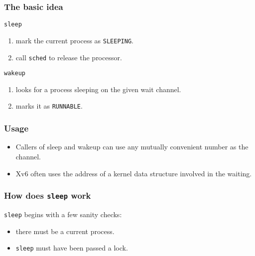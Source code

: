 \documentclass{beamer}
\begin{document}
\begin{frame}[t]
  \frametitle{The basic idea}
  \texttt{sleep}
  \begin{enumerate}
  \item mark the current process as \texttt{SLEEPING}.
  \item call \texttt{sched} to release the processor.
  \end{enumerate}

  \texttt{wakeup}
  \begin{enumerate}
  \item looks for a process sleeping on the given wait channel.
  \item marks it as \texttt{RUNNABLE}.
  \end{enumerate}
  

\end{frame}


\begin{frame}[t]
  \frametitle{Usage}

  \begin{itemize}
  \item Callers of sleep and wakeup can use any mutually convenient number as the channel.
  \item Xv6 often uses the address of a kernel data structure involved in the waiting.
  \end{itemize}
  
\end{frame}


\begin{frame}[t]
  \frametitle{How does \texttt{sleep} work}

  \texttt{sleep} begins with a few sanity checks:
  \begin{itemize}
  \item there must be a current process.
  \item \texttt{sleep} must have been passed a lock.
  \end{itemize}
  
\end{frame}

\end{document}
